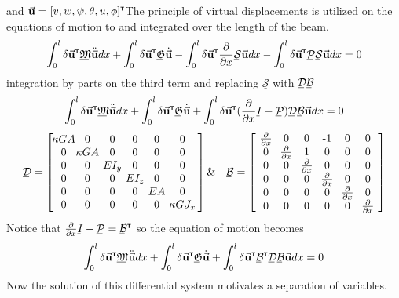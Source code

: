 and $ \vec{\mathbf{u}}=[v,w,\psi,\theta,u,\phi]^{\textbf{{\tiny \textsf{T}}}} $The principle of virtual displacements is utilized on the equations of motion to and integrated over the length of the beam.
\begin{equation}\label{key}
\int_0^l \delta\vec{\mathbf{u}}^\T\bunderline{\mathfrak{M}}\ddot{\vec{\mathbf{u}}}dx+\int_0^l \delta\vec{\mathbf{u}}^\T\bunderline{\mathfrak{G}}\dot{\vec{\mathbf{u}}}-\int_0^l\delta\vec{\mathbf{u}}^\T\frac{\partial}{\partial x}\bunderline{\mathcal{S}}\vec{\mathbf{u}}dx-\int_0^l\delta\vec{\mathbf{u}}^\T\bunderline{\mathcal{P}}\bunderline{\mathcal{S}}\vec{\mathbf{u}}dx=0
\end{equation}
integration by parts on the third term and replacing $ \underline{\mathcal{S}} $ with $ \bunderline{\mathcal{D}}\bunderline{\mathcal{B}} $
\begin{equation}\label{key}
\int_0^l \delta\vec{\mathbf{u}}^\T\bunderline{\mathfrak{M}}\ddot{\vec{\mathbf{u}}}dx+\int_0^l \delta\vec{\mathbf{u}}^\T\bunderline{\mathfrak{G}}\dot{\vec{\mathbf{u}}}+\int_0^l\delta\vec{\mathbf{u}}^\T(\frac{\partial}{\partial x}\bunderline{I}-\bunderline{\mathcal{P}})\bunderline{\mathcal{D}}\bunderline{\mathcal{B}}\vec{\mathbf{u}}dx=0
\end{equation}
\begin{equation}\label{key}
\def\cs{1.5em}
\bunderline{\mathcal{D}}=\left[\arraycolsep=1.8pt\begin{array}{cccccc}
\makebox[\cs]{$\kappa GA$}&\makebox[\cs]{0}&\makebox[\cs]{0}&\makebox[\cs]{0}&\makebox[\cs]{0}&\makebox[\cs]{0}\\
0&\kappa GA&0&0&0&0\\
0&0&EI_y&0&0&0\\
0&0&0&EI_z&0&0\\
0&0&0&0&EA&0\\
0&0&0&0&0&\kappa GJ_x
\end{array}\right] \&\quad \bunderline{\mathcal{B}}=\left[\arraycolsep=1.8pt\begin{array}{cccccc}
\makebox[\cs]{$\frac{\partial}{\partial x}$}&\makebox[\cs]{0}&\makebox[\cs]{0}&\makebox[\cs]{-1}&\makebox[\cs]{0}&\makebox[\cs]{0}\\
0&\frac{\partial}{\partial x}&1&0&0&0\\
0&0&\frac{\partial}{\partial x}&0&0&0\\
0&0&0&\frac{\partial}{\partial x}&0&0\\
0&0&0&0&\frac{\partial}{\partial x}&0\\
0&0&0&0&0&\frac{\partial}{\partial x}
\end{array}\right]
\end{equation}
Notice that $ \frac{\partial}{\partial x}\bunderline{I}-\bunderline{\mathcal{P}}=\bunderline{\mathcal{B}}^\T $ so the equation of motion becomes
\begin{equation}\label{eq:EqauationOfMotionVirtual}
\int_0^l \delta\vec{\mathbf{u}}^\T\bunderline{\mathfrak{M}}\ddot{\vec{\mathbf{u}}}dx+\int_0^l \delta\vec{\mathbf{u}}^\T\bunderline{\mathfrak{G}}\dot{\vec{\mathbf{u}}}+\int_0^l\delta\vec{\mathbf{u}}^\T\bunderline{\mathcal{B}}^\T\bunderline{\mathcal{D}}\bunderline{\mathcal{B}}\vec{\mathbf{u}}dx=0
\end{equation}
Now the solution of this differential system motivates a separation of variables.
